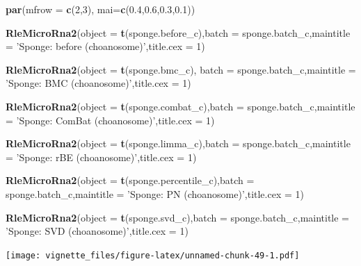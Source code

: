 \documentclass[]{book}
\newenvironment{Shaded}{\begin{snugshade}}{\end{snugshade}}
\newcommand{\KeywordTok}[1]{\textcolor[rgb]{0.13,0.29,0.53}{\textbf{#1}}}
\newcommand{\DataTypeTok}[1]{\textcolor[rgb]{0.13,0.29,0.53}{#1}}
\newcommand{\DecValTok}[1]{\textcolor[rgb]{0.00,0.00,0.81}{#1}}
\newcommand{\FloatTok}[1]{\textcolor[rgb]{0.00,0.00,0.81}{#1}}
\newcommand{\StringTok}[1]{\textcolor[rgb]{0.31,0.60,0.02}{#1}}
\newcommand{\NormalTok}[1]{#1}
\begin{document}
\begin{Shaded}
\begin{Highlighting}[]
\KeywordTok{par}\NormalTok{(}\DataTypeTok{mfrow =} \KeywordTok{c}\NormalTok{(}\DecValTok{2}\NormalTok{,}\DecValTok{3}\NormalTok{), }\DataTypeTok{mai=}\KeywordTok{c}\NormalTok{(}\FloatTok{0.4}\NormalTok{,}\FloatTok{0.6}\NormalTok{,}\FloatTok{0.3}\NormalTok{,}\FloatTok{0.1}\NormalTok{))}

\KeywordTok{RleMicroRna2}\NormalTok{(}\DataTypeTok{object =} \KeywordTok{t}\NormalTok{(sponge.before_c),}\DataTypeTok{batch =}\NormalTok{ sponge.batch_c,}\DataTypeTok{maintitle =} \StringTok{'Sponge: before (choanosome)'}\NormalTok{,}\DataTypeTok{title.cex =} \DecValTok{1}\NormalTok{)}

\KeywordTok{RleMicroRna2}\NormalTok{(}\DataTypeTok{object =} \KeywordTok{t}\NormalTok{(sponge.bmc_c), }\DataTypeTok{batch =}\NormalTok{ sponge.batch_c,}\DataTypeTok{maintitle =} \StringTok{'Sponge: BMC (choanosome)'}\NormalTok{,}\DataTypeTok{title.cex =} \DecValTok{1}\NormalTok{)}

\KeywordTok{RleMicroRna2}\NormalTok{(}\DataTypeTok{object =} \KeywordTok{t}\NormalTok{(sponge.combat_c),}\DataTypeTok{batch =}\NormalTok{ sponge.batch_c,}\DataTypeTok{maintitle =} \StringTok{'Sponge: ComBat (choanosome)'}\NormalTok{,}\DataTypeTok{title.cex =} \DecValTok{1}\NormalTok{)}

  \KeywordTok{RleMicroRna2}\NormalTok{(}\DataTypeTok{object =} \KeywordTok{t}\NormalTok{(sponge.limma_c),}\DataTypeTok{batch =}\NormalTok{ sponge.batch_c,}\DataTypeTok{maintitle =} \StringTok{'Sponge: rBE (choanosome)'}\NormalTok{,}\DataTypeTok{title.cex =} \DecValTok{1}\NormalTok{)}

\KeywordTok{RleMicroRna2}\NormalTok{(}\DataTypeTok{object =} \KeywordTok{t}\NormalTok{(sponge.percentile_c),}\DataTypeTok{batch =}\NormalTok{ sponge.batch_c,}\DataTypeTok{maintitle =} \StringTok{'Sponge: PN (choanosome)'}\NormalTok{,}\DataTypeTok{title.cex =} \DecValTok{1}\NormalTok{)}

\KeywordTok{RleMicroRna2}\NormalTok{(}\DataTypeTok{object =} \KeywordTok{t}\NormalTok{(sponge.svd_c),}\DataTypeTok{batch =}\NormalTok{ sponge.batch_c,}\DataTypeTok{maintitle =} \StringTok{'Sponge: SVD (choanosome)'}\NormalTok{,}\DataTypeTok{title.cex =} \DecValTok{1}\NormalTok{)}
\end{Highlighting}
\end{Shaded}

\texttt{[image: vignette\_files/figure-latex/unnamed-chunk-49-1.pdf]}
\end{document}
